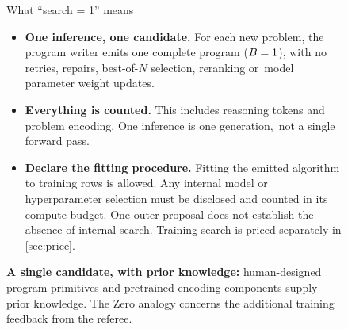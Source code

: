 \begin{figure}[tb]%
\begin{explainer}[label=box:searchone]{What ``search = 1'' means}
\begin{itemize}[leftmargin=*,nosep]
  \item \textbf{One inference, one candidate.} For each new problem, the program
    writer emits one complete program ($B = 1$), with no retries, repairs,
    best-of-$N$ selection, reranking \mbox{or model} parameter weight updates.
  \item \textbf{Everything is counted.} This includes reasoning tokens and
    problem encoding. One inference is one \mbox{generation, not} a single forward pass.
  \item \textbf{Declare the fitting procedure.} Fitting the emitted algorithm
    to training rows is allowed. Any internal model or hyperparameter
    selection must be disclosed and counted in its compute budget. One
    outer \mbox{proposal} does not establish the absence of internal search.
    \mbox{Training} search is priced separately in \cref{sec:price}.
\end{itemize}
\textbf{A single candidate, with prior knowledge:} human-designed program
primitives and pretrained encoding components supply prior knowledge. The
Zero analogy concerns the additional training feedback from the referee.
\end{explainer}
\end{figure}

